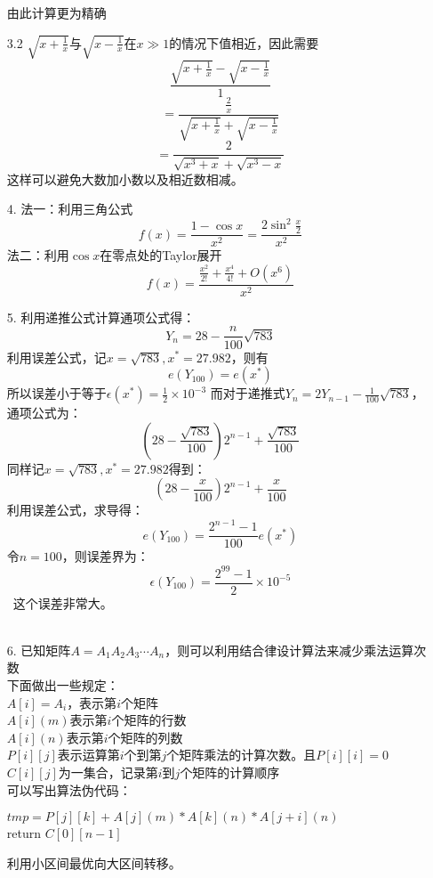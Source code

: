 \documentclass[UTF-8]{ctexart}
\begin{document}
\begin{itemize}
		由此计算更为精确\newline\newline
		\item[3.2]$\sqrt{x+\frac{1}{x}}$与$\sqrt{x- \frac{1}{x}}$在$x\gg 1$的情况下值相近，因此需要
		\[\frac{\sqrt{x+\frac{1}{x}} - \sqrt{x- \frac{1}{x}}}{1}\]
		\[= \frac{\frac{2}{x}}{\sqrt{x+\frac{1}{x}}+\sqrt{x- \frac{1}{x}}}\]
		\[= \frac{2}{\sqrt{x^3 + x} + \sqrt{x^3 - x}}\]
		这样可以避免大数加小数以及相近数相减。\newline\newline
		\item[4.]法一：利用三角公式
		\[f(x) = \frac{1 - \cos{x}}{x^2} = \frac{2\sin^2{\frac{x}{2}}}{x^2}\]
		法二：利用$\cos{x}$在零点处的Taylor展开
		\[f(x) = \frac{\frac{x^2}{2!} + \frac{x^4}{4!} + O(x^6)}{x^2}\]
		\newline
		\item[5.]利用递推公式计算通项公式得：\[Y_{n} = 28 - \frac{n}{100}\sqrt{783}\]
		利用误差公式，记$x = \sqrt{783}, x^{*} = 27.982$，则有
		\[e(Y_{100}) = e(x^{*})\]
		所以误差小于等于$\epsilon(x^{*}) = \frac{1}{2} \times 10^{-3}$\newline
		而对于递推式$Y_n = 2Y_{n - 1} - \frac{1}{100}\sqrt{783}$，通项公式为：
		\[(28 - \frac{\sqrt{783}}{100})2^{n - 1} +\frac{\sqrt{783}}{100}\]
		同样记$x = \sqrt{783}, x^{*} = 27.982$得到：
		\[(28 - \frac{x}{100})2^{n - 1} +\frac{x}{100}\]
		利用误差公式，求导得：
		\[e(Y_{100}) = \frac{2^{n - 1} - 1}{100} e(x^{*})\]
		令$n = 100$，则误差界为：
		\[\epsilon(Y_{100}) = \frac{2^{99} - 1}{2} \times 10^{-5}\]\
		这个误差非常大。\\ \\
		\item[6.] 已知矩阵$A = A_1A_2A_3 \cdots A_n$，则可以利用结合律设计算法来减少乘法运算次数\\
		下面做出一些规定：\\
		$A[i] = A_i$，表示第$i$个矩阵\\$A[i](m)$表示第$i$个矩阵的行数\\$A[i](n)$表示第$i$个矩阵的列数\\
		$P[i][j]$表示运算第$i$个到第$j$个矩阵乘法的计算次数。且$P[i][i] = 0$\\
		$C[i][j]$为一集合，记录第$i$到$j$个矩阵的计算顺序\\
		可以写出算法伪代码：\\
		\begin{algorithm}
			{
				{
					{
						$tmp = P[j][k] + A[j](m) * A[k](n) * A[j + i](n)$\\
					}
				}
			}
			return $C[0][n - 1]$
		\end{algorithm}
		利用小区间最优向大区间转移。
		\end{itemize}
\end{document}
